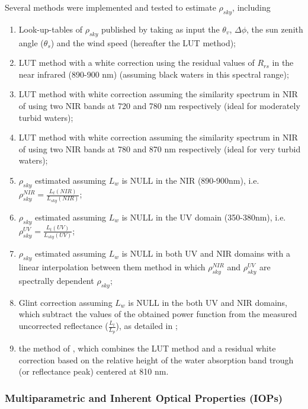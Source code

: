 \documentclass[essd, manuscript]{copernicus}
\begin{document}
Several methods were implemented and tested to estimate $\rho_{sky}$, including 
\begin{enumerate}
    \item Look-up-tables of $\rho_{sky}$ published by  \citet{Mobley1999,Mobley2015} taking as input the $\theta_v$, $\Delta\phi$, the sun zenith angle ($\theta_s$) and the wind speed (hereafter the LUT method);
    \item LUT method with a white correction using the residual values of $R_{rs}$ in the near infrared (890-900 nm) (assuming black waters in this spectral range); 
    \item LUT method with white correction assuming the similarity spectrum in NIR of \citet{Ruddick2006} using two NIR bands at 720 and 780 nm respectively (ideal for moderately turbid waters); 
    \item LUT method with white correction assuming the similarity spectrum in NIR of \citet{Ruddick2006} using two NIR bands at 780 and 870 nm respectively (ideal for very turbid waters); 
    \item $\rho_{sky}$ estimated assuming $L_w$ is NULL in the NIR (890-900nm), i.e. $\rho_{sky}^{NIR} = \frac{L_t(NIR)}{L_{sky}(NIR)}$;
    \item $\rho_{sky}$ estimated assuming $L_w$ is NULL in the UV domain (350-380nm), i.e. $\rho_{sky}^{UV} = \frac{L_t(UV)}{L_{sky}(UV)}$;
    \item $\rho_{sky}$ estimated assuming $L_w$ is NULL in both UV and NIR domains with a linear interpolation between them \citet{Kutser2013} method in which $\rho_{sky}^{NIR}$ and $\rho_{sky}^{UV}$ are spectrally dependent $\rho_{sky}$;
    \item Glint correction assuming $L_w$ is NULL in the both UV and NIR domains, which subtract the values of the obtained power function from the measured uncorrected reflectance ($\frac{L_t}{L_p}$), as detailed in ; 
    \item the method of \citet{Jiang2020}, which combines the LUT method and a residual white correction based on the relative height of the water absorption band trough (or reflectance peak) centered at 810 nm.  
\end{enumerate} 




\subsubsection{Multiparametric and Inherent Optical Properties (IOPs)}
\end{document}
